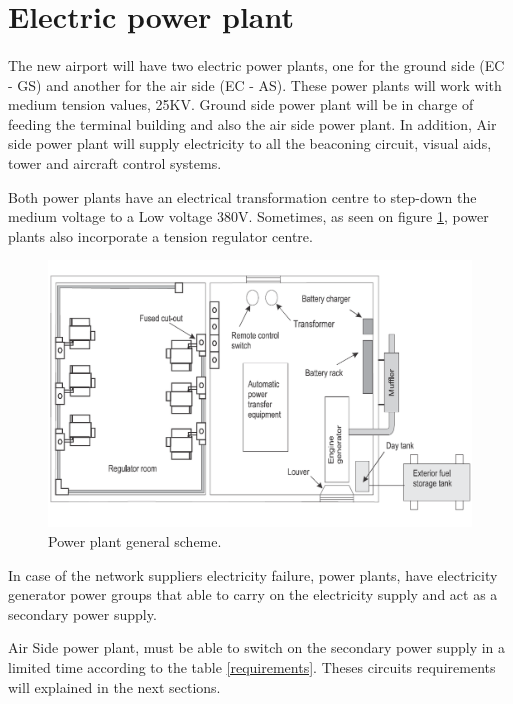 	\section{Electric power plant}
	\paragraph{} The new airport will have two electric power plants, one for the ground side (EC - GS) and another for the air side (EC - AS). These power plants will work with medium tension values, 25KV. Ground side power plant will be in charge of feeding the terminal building and also the air side power plant. In addition, Air side power plant will supply electricity to all the beaconing circuit, visual aids, tower and aircraft control systems.
	
	Both power plants have an electrical transformation centre to step-down the medium voltage to a Low voltage 380V. Sometimes, as seen on figure \ref{powerplant}, power plants also incorporate a tension regulator centre.
	
	\begin{figure}[H]
		\centering
		\includegraphics[clip, trim=0cm 0cm 0cm 0cm, width=.7\textwidth]{./images/electric/powerplant}
		\caption{Power plant general scheme.}
		\label{powerplant}
	\end{figure}
	
	In case of the network suppliers electricity failure, power plants, have electricity generator power groups that able to carry on the electricity supply and act as a secondary power supply. 
	
	Air Side power plant, must be able to switch on the secondary power supply in a limited time according to the table \ref{requirements}. Theses circuits requirements will explained in the next sections.  
	
